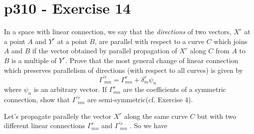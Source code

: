 \section{p310 - Exercise 14}
\begin{tcolorbox}
In a space with linear connection, we say that the \textit{directions} of two vectors, $X^r$ at a point $A$ and $Y^r$ at a point $B$, are parallel with respect to a curve $C$ which joins $A$ and $B$ if the vector obtained by parallel propagation of $X^r$ along $C$ from $A$ to $B$ is a multiple of $Y^r$. Prove that the most general change of linear connection which preserves parallelism of directions (with respect to all curves) is given by 
$$\Gamma^{'r}_{\ mn} = \Gamma^r_{mn} + \delta^r_m \psi_n$$
where $\psi_n$ is an arbitrary vector. If $\Gamma^r_{mn}$ are the coefficients of a symmetric connection, show that $\Gamma^{'r}_{\ mn}$ are semi-symmetric(cf. Exercise 4).
\end{tcolorbox}
Let's propagate parallely the vector $X^r$ along the same curve $C$ but with two different linear connections $\Gamma^r_{mn}$ and $\Gamma^{'r}_{\ mn}$ . 
So we have

